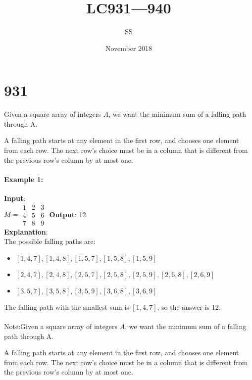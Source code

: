 \documentclass[a4paper,12pt]{article}
\title{LC931---940}
\author{SS}
\date{November 2018}
\begin{document}
\maketitle

\section{931}
Given a square array of integers $A$, we want the minimum sum of a falling path through A.
\par
A falling path starts at any element in the first row, and chooses one element from each row.  The next row's choice must be in a column that is different from the previous row's column by at most one.
\paragraph{Example 1:}
\begin{flushleft}
\textbf{Input}:
\\
$M = \begin{array}{ccc}
1 & 2 & 3 \\
4 & 5 & 6 \\
7 & 8 & 9 
\end{array}$
\textbf{Output}: 12
\\
\textbf{Explanation}:
\\
The possible falling paths are:
\begin{itemize}
\item $[1,4,7], [1,4,8], [1,5,7], [1,5,8], [1,5,9]$
\item $[2,4,7], [2,4,8], [2,5,7], [2,5,8], [2,5,9], [2,6,8], [2,6,9]$
\item $[3,5,7], [3,5,8], [3,5,9], [3,6,8], [3,6,9]$
\end{itemize}
The falling path with the smallest sum is $[1,4,7]$, so the answer is 12.
\end{flushleft}
\paragraph{}
Note:Given a square array of integers $A$, we want the minimum sum of a falling path through A.
\par
A falling path starts at any element in the first row, and chooses one element from each row.  The next row's choice must be in a column that is different from the previous row's column by at most one.
\end{document}
